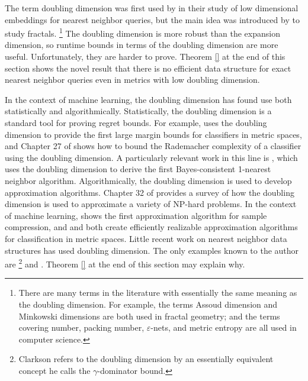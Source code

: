 \documentclass[../main.tex]{subfiles}
\begin{document}
The term doubling dimension was first used by \citet{gupta2003bounded} in their study of low dimensional embeddings for nearest neighbor queries,
but the main idea was introduced by \citet{assoud1979etude} to study fractals.%
\footnote{
    There are many terms in the literature with essentially the same meaning as the doubling dimension.
    For example, the terms Assoud dimension and Minkowski dimensions are both used in fractal geometry;
    and the terms covering number, packing number, $\varepsilon$-nets, and metric entropy are all used in computer science. 
}
The doubling dimension is more robust than the expansion dimension,
so runtime bounds in terms of the doubling dimension are more useful. 
Unfortunately, they are harder to prove.
Theorem \ref{} at the end of this section shows the novel result that there is no efficient data structure for exact nearest neighbor queries even in metrics with low doubling dimension.

In the context of machine learning, the doubling dimension has found use both statistically and algorithmically.
Statistically, the doubling dimension is a standard tool for proving regret bounds.
For example, \citet{luxburg2004distance} uses the doubling dimension to provide the first large margin bounds for classifiers in metric spaces,
and Chapter 27 of \cite{shalev2014understanding} shows how to bound the Rademacher complexity of a classifier using the doubling dimension.
A particularly relevant work in this line is \citet{kontorovich2015bayes},
which uses the doubling dimension to derive the first Bayes-consistent 1-nearest neighbor algorithm.
Algorithmically, the doubling dimension is used to develop approximation algorithms.
Chapter 32 of \cite{toth2017handbook} provides a survey of how the doubling dimension is used to approximate a variety of NP-hard problems.
In the context of machine learning, \citet{gottlieb2014near} shows the first approximation algorithm for sample compression,
and
\citet{gottlieb2014efficient} and \citet{gottlieb2017efficient} both create efficiently realizable approximation algorithms for classification in metric spaces.
Little recent work on nearest neighbor data structures has used doubling dimension.
The only examples known to the author are \citet{clarkson1997nearest}\footnote{Clarkson refers to the doubling dimension by an essentially equivalent concept he calls the $\gamma$-dominator bound.} and \citet{krauthgamer2004navigating}.
Theorem \ref{} at the end of this section may explain why.
\end{document}
